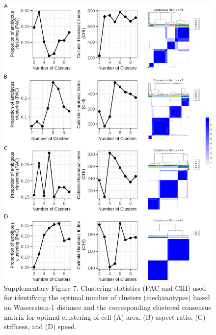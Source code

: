 \documentclass[11pt,letterpaper,english,oneside]{article} %
\begin{document}
\begin{figure}[H]
    \centering
    \includegraphics[scale=0.3]{../Figures/Supplementary_Figure7/supplementary_figure7.png} 
    \caption{Supplementary Figure 7: Clustering statistics (PAC and CHI) used for identifying the optimal number of clusters (mechanotypes) based on Wasserstein-1 distance and the corresponding clustered consensus matrix for optimal clustering
    of cell (A) area, (B) aspect ratio, (C) stiffness, and (D) speed.}
    \label{fig:fig7}
\end{figure}
\end{document}
